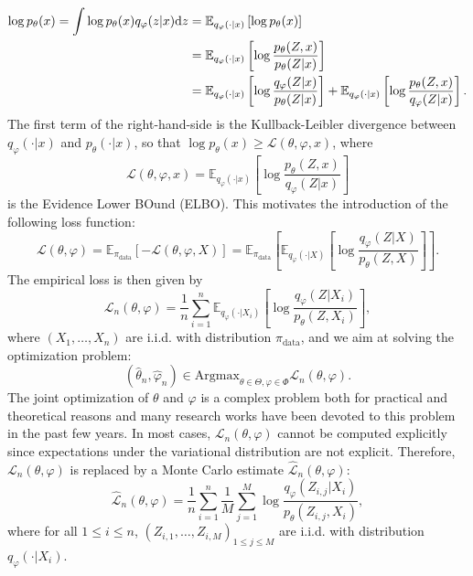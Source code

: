 \documentclass[english,graybox,envcountchap,envcountsame,sectrefs,shortlabels]{svmono}
\theoremstyle{style}
\newcommand{\eqsp}{}
\begin{document}
\begin{align*}
\log p_\theta(x) = \int \log p_\theta(x) q_{\varphi}(z|x) \mathrm{d} z &= \mathbb{E}_{q_{\varphi}(\cdot|x)}\left[\log p_\theta(x)\right] \\
&= \mathbb{E}_{q_{\varphi}(\cdot|x)}\left[\log \frac{p_\theta(Z,x)}{p_\theta(Z|x)}\right] \\
&= \mathbb{E}_{q_{\varphi}(\cdot|x)}\left[\log \frac{q_{\varphi}(Z|x)}{p_\theta(Z|x)}\right]  + \mathbb{E}_{q_{\varphi}(\cdot|x)}\left[\log \frac{p_\theta(Z,x)}{q_{\varphi}(Z|x)}\right] .
\end{align*}
The first term of the right-hand-side is the Kullback-Leibler divergence between $q_{\varphi}(\cdot|x)$ and $p_\theta(\cdot|x)$, so that $\log p_\theta(x)\geq \mathcal{L}(\theta,\varphi,x)$, where
$$
\mathcal{L}(\theta,\varphi,x) = \mathbb{E}_{q_{\varphi}(\cdot|x)}\left[\log \frac{p_\theta(Z,x)}{q_{\varphi}(Z|x)}\right]
$$
is the Evidence Lower BOund (ELBO). 
This motivates the introduction of the following loss function:
$$
\mathcal{L}(\theta,\varphi) = \mathbb{E}_{\pi_{\mathrm{data}}}[-\mathcal{L}(\theta,\varphi,X)] = \mathbb{E}_{\pi_{\mathrm{data}}}\left[\mathbb{E}_{q_{\varphi}(\cdot|X)}\left[\log \frac{q_{\varphi}(Z|X)}{p_\theta(Z,X)}\right]\right]\eqsp.
$$
The empirical loss is then given by
$$
\mathcal{L}_n(\theta,\varphi) = \frac{1}{n}\sum_{i=1}^n\mathbb{E}_{q_{\varphi}(\cdot|X_i)}\left[\log \frac{q_{\varphi}(Z|X_i)}{p_\theta(Z,X_i)}\right]\eqsp,
$$
where $(X_1,\ldots,X_n)$ are i.i.d. with distribution $\pi_{\mathrm{data}}$, and we aim at solving the optimization problem:
\begin{equation}
\label{eq:optim:ELBO}
(\widehat \theta_n,\widehat \varphi_n) \in \mathrm{Argmax}_{\theta\in\Theta,\varphi\in\Phi}\eqsp \mathcal{L}_n(\theta,\varphi) \eqsp.
\end{equation}
The joint optimization of $\theta$ and $\varphi$ is a complex problem both for practical and theoretical reasons and many research works have been devoted to this problem in the past few years. In most cases, $\mathcal{L}_n(\theta,\varphi)$ cannot be computed explicitly since expectations under the variational distribution are not explicit. Therefore, $\mathcal{L}_n(\theta,\varphi) $ is replaced by a Monte Carlo estimate $\widehat{\mathcal{L}}_n(\theta,\varphi)$:
$$
\widehat{\mathcal{L}}_n(\theta,\varphi) =  \frac{1}{n}\sum_{i=1}^n\frac{1}{M}\sum_{j=1}^M\log \frac{q_{\varphi}(Z_{i,j}|X_i)}{p_\theta(Z_{i,j},X_i)}\eqsp,
$$ 
where for all $1\leqslant i \leqslant n$, $(Z_{i,1},\ldots,Z_{i,M})_{1\leqslant j\leqslant M}$ are i.i.d. with distribution $q_{\varphi}(\cdot|X_i)$.
\end{document}
